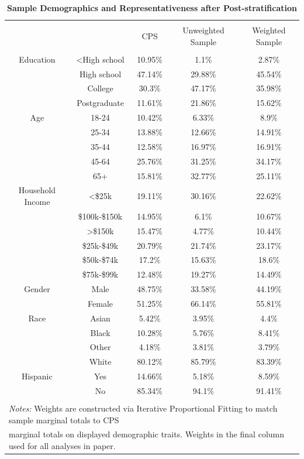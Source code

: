 
\begin{table}[!htbp] \centering 
  \caption{\textbf{Sample Demographics and Representativeness after Post-stratification}} 
  \label{tab:weights} 
\footnotesize 
\begin{tabular}{@{\extracolsep{5pt}} ccccc} 
\\[-1.8ex]\hline 
\hline \\[-1.8ex] 
 &  & CPS & Unweighted Sample & Weighted Sample \\ 
\hline \\[-1.8ex] 
Education & \textless High school & 10.95\% & 1.1\% & 2.87\% \\ 
 & High school & 47.14\% & 29.88\% & 45.54\% \\ 
 & College & 30.3\% & 47.17\% & 35.98\% \\ 
 & Postgraduate & 11.61\% & 21.86\% & 15.62\% \\ 
Age & 18-24 & 10.42\% & 6.33\% & 8.9\% \\ 
 & 25-34 & 13.88\% & 12.66\% & 14.91\% \\ 
 & 35-44 & 12.58\% & 16.97\% & 16.91\% \\ 
 & 45-64 & 25.76\% & 31.25\% & 34.17\% \\ 
 & 65+ & 15.81\% & 32.77\% & 25.11\% \\ 
Household Income & \textless \$25k & 19.11\% & 30.16\% & 22.62\% \\ 
 & \$100k-\$150k & 14.95\% & 6.1\% & 10.67\% \\ 
 & \textgreater \$150k & 15.47\% & 4.77\% & 10.44\% \\ 
 & \$25k-\$49k & 20.79\% & 21.74\% & 23.17\% \\ 
 & \$50k-\$74k & 17.2\% & 15.63\% & 18.6\% \\ 
 & \$75k-\$99k & 12.48\% & 19.27\% & 14.49\% \\ 
Gender & Male & 48.75\% & 33.58\% & 44.19\% \\ 
 & Female & 51.25\% & 66.14\% & 55.81\% \\ 
Race & Asian & 5.42\% & 3.95\% & 4.4\% \\ 
 & Black & 10.28\% & 5.76\% & 8.41\% \\ 
 & Other & 4.18\% & 3.81\% & 3.79\% \\ 
 & White & 80.12\% & 85.79\% & 83.39\% \\ 
Hispanic & Yes & 14.66\% & 5.18\% & 8.59\% \\ 
 & No & 85.34\% & 94.1\% & 91.41\% \\ 
\hline \\[-1.8ex] 
\multicolumn{5}{l}{\scriptsize \textit{Notes:} Weights are constructed via Iterative Proportional Fitting to match sample marginal totals to CPS} \\ 
\multicolumn{5}{l}{\scriptsize marginal totals on displayed demographic traits. Weights in the final column used for all analyses in paper.} \\ 
\end{tabular} 
\end{table} 
